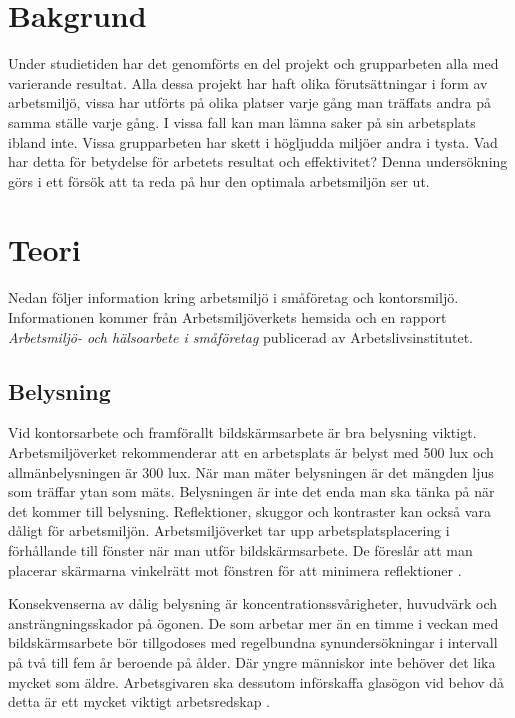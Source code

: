 \section{Bakgrund}
\label{sec:background-hampus}

Under studietiden har det genomförts en del projekt och grupparbeten alla med varierande resultat. Alla dessa projekt har haft olika förutsättningar i form av arbetsmiljö, vissa har utförts på olika platser varje gång man träffats andra på samma ställe varje gång. I vissa fall kan man lämna saker på sin arbetsplats ibland inte. Vissa grupparbeten har skett i högljudda miljöer andra i tysta. Vad har detta för betydelse för arbetets resultat och effektivitet? Denna undersökning görs i ett försök att ta reda på hur den optimala arbetsmiljön ser ut. 

\section{Teori}
\label{sec:theory-hampus}
Nedan följer information kring arbetsmiljö i småföretag och kontorsmiljö. Informationen kommer från Arbetsmiljöverkets hemsida och en rapport \textit{Arbetsmiljö- och hälsoarbete i småföretag} publicerad av Arbetslivsinstitutet\cite{AV}\cite{smaforetag}.

\subsection{Belysning}
Vid kontorsarbete och framförallt bildskärmsarbete är bra belysning viktigt. Arbetsmiljöverket rekommenderar att en arbetsplats är belyst med 500 lux och allmänbelysningen är 300 lux. När man mäter belysningen är det mängden ljus som träffar ytan som mäts. Belysningen är inte det enda man ska tänka på när det kommer till belysning. Reflektioner, skuggor och kontraster kan också vara dåligt för arbetsmiljön. Arbetsmiljöverket tar upp arbetsplatsplacering i förhållande till fönster när man utför bildskärmsarbete. De föreslår att man placerar skärmarna vinkelrätt mot fönstren för att minimera reflektioner \cite{AVLjus}\cite{AVDator}.

Konsekvenserna av dålig belysning är koncentrationssvårigheter, huvudvärk och ansträngningsskador på ögonen. De som arbetar mer än en timme i veckan med bildskärmsarbete bör tillgodoses med regelbundna synundersökningar i intervall på två till fem år beroende på ålder. Där yngre människor inte behöver det lika mycket som äldre. Arbetsgivaren ska dessutom införskaffa glasögon vid behov då detta är ett mycket viktigt arbetsredskap \cite{AVLjus}.


